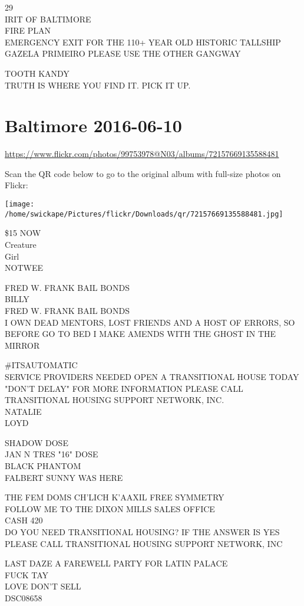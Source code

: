\documentclass[10pt,letterpaper]{article}
\begin{document}
29\\
IRIT OF BALTIMORE\\
FIRE PLAN\\
EMERGENCY EXIT FOR THE 110+ YEAR OLD HISTORIC TALLSHIP GAZELA PRIMEIRO PLEASE USE THE OTHER GANGWAY

TOOTH KANDY\\
TRUTH IS WHERE YOU FIND IT.  PICK IT UP.


\section*{Baltimore 2016-06-10}

\url{https://www.flickr.com/photos/99753978@N03/albums/72157669135588481}

Scan the QR code below to go to the original album with full-size photos on Flickr:

\texttt{[image: /home/swickape/Pictures/flickr/Downloads/qr/72157669135588481.jpg]}


\$15 NOW\\
Creature\\
Girl\\
NOTWEE

FRED W. FRANK BAIL BONDS\\
BILLY\\
FRED W. FRANK BAIL BONDS\\
I OWN DEAD MENTORS, LOST FRIENDS AND A HOST OF ERRORS, SO BEFORE GO TO BED I MAKE AMENDS WITH THE GHOST IN THE MIRROR

\#ITSAUTOMATIC\\
SERVICE PROVIDERS NEEDED OPEN A TRANSITIONAL HOUSE TODAY "DON'T DELAY" FOR MORE INFORMATION PLEASE CALL TRANSITIONAL HOUSING SUPPORT NETWORK, INC.\\
NATALIE\\
LOYD

SHADOW DOSE\\
JAN N TRES "16" DOSE\\
BLACK PHANTOM\\
FALBERT SUNNY WAS HERE

THE FEM DOMS CH'LICH K'AAXIL FREE SYMMETRY\\
FOLLOW ME TO THE DIXON MILLS SALES OFFICE\\
CASH 420\\
DO YOU NEED TRANSITIONAL HOUSING?  IF THE ANSWER IS YES PLEASE CALL TRANSITIONAL HOUSING SUPPORT NETWORK, INC

LAST DAZE A FAREWELL PARTY FOR LATIN PALACE\\
FUCK TAY\\
LOVE DON'T SELL\\
DSC08658
\end{document}
